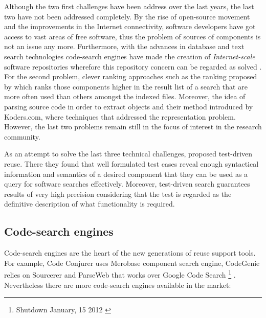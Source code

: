 Although the two first challenges have been address over the last years, the last two have not been addressed completely. By the rise of open-source movement and the improvements in the Internet connectivity, software developers have got access to vast areas of free software, thus the problem of sources of components is not an issue any more. Furthermore, with the advances in database and text search technologies code-search engines have made the creation of \textit{Internet-scale} software repositories wherefore this repository concern can be regarded as solved \cite{Hummel2013}. For the second problem, clever ranking approaches such as the ranking proposed by \citet{Inoue2005} which ranks those components higher in the result list of a search that are more often used than others amongst the indexed files. Moreover, the idea of parsing source code in order to extract objects and their method introduced by Koders.com, where techniques that addressed the representation problem. However, the last two problems remain still in the focus of interest in the research community.

As an attempt to solve the last three technical challenges, \citet{Hummel2013} proposed test-driven reuse. There they found that well formulated test cases reveal enough syntactical information and semantics of a desired component that they can be used as a query for software searches effectively\cite{Hummel2013}. Moreover, test-driven search guarantees results of very high precision considering that the test is regarded as the definitive description of what functionality is required\citep{Beck2003,Hummel2013,Kessel2016}.

\subsection{Code-search engines}
Code-search engines are the heart of the new generations of reuse support tools. For example, Code Conjurer \cite{Hummel2008} uses Merobase component search engine, CodeGenie relies on Sourcerer \cite{Lemos2007} and ParseWeb that works over Google Code Search \footnote{Shutdown January, 15 2012 \cite{Horowitz2011}} \cite{Thummalapenta2007}. Nevertheless there are more code-search engines available in the market:

